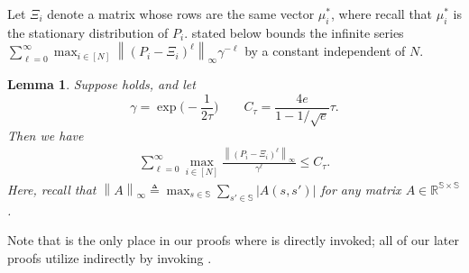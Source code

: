 \documentclass{article}
\theoremstyle{plain}
\newtheorem{lemma}{Lemma}
\theoremstyle{remark}
\newcommand{\norm}[1]{\left\lVert#1\right\rVert}
\newcommand{\R}{\mathbb{R}}
\newcommand{\abs}[1]{\left\lvert#1\right\rvert}
\newcommand{\sspa}{\mathbb{S}}
\newcommand{\Ctau}{C_\tau}
\begin{document}
Let $\Xi_i$ denote a matrix whose rows are the same vector $\mu_i^*$, where recall that $\mu_i^*$ is the stationary distribution of $P_i$. 
 stated below bounds the infinite series $\sum_{\ell=0}^{\infty} \max_{i\in[N]}\norm{(P_i-\Xi_i)^\ell}_\infty \gamma^{-\ell}$ by a constant independent of $N$. 



\begin{lemma}\label{lem:cgamma}
    Suppose  holds, and let
    \[
        \gamma = \exp\Big(-\frac{1}{2\tau}\Big) \qquad \Ctau = \frac{4e}{1-1/\sqrt{e}} \tau.
    \]
    Then we have
    \begin{align*}
        \sum_{\ell=0}^{\infty} \max_{i\in[N]}\frac{\norm{(P_i-\Xi_i)^\ell}_\infty}{\gamma^\ell} \leq \Ctau. 
\end{align*}
 Here, recall that $\norm{A}_\infty \triangleq \max_{s\in\sspa} \sum_{s'\in\sspa}\abs{A(s,s')}$ for any matrix $A\in \R^{\sspa\times\sspa}$. 
\end{lemma}

Note that  is the only place in our proofs where  is directly invoked; all of our later proofs utilize  indirectly by invoking . 
\end{document}
